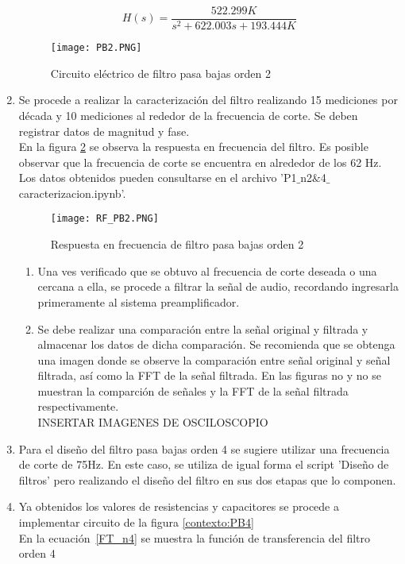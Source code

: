 \documentclass[10pt,letterpaper,spanish,twoside]{report}
\begin{document}
\begin{enumerate}
\begin{equation}
 	H(s)=\frac{522.299K}{s^2+622.003s+193.444K}\label{FT_n2}
 \end{equation}  
 \begin{figure}[H]
 	\centering
 	\texttt{[image: PB2.PNG]}
 	\caption{Circuito eléctrico de filtro pasa bajas orden 2}
	\label{contexto:PB2}
 \end{figure}
 \item Se procede a realizar la caracterización del filtro realizando 15 mediciones por década y 10 mediciones al rededor de la frecuencia de corte. Se deben registrar datos de magnitud y fase.
 \\ En la figura \ref{contexto:RF_2} se observa la respuesta en frecuencia del filtro. Es posible observar que la frecuencia de corte se encuentra en alrededor de los 62 Hz.
 \\Los datos obtenidos pueden consultarse en el archivo 'P1$\_$n2$\&$4$\_$caracterizacion.ipynb'.
 \begin{figure}[H]
 	\centering
 	\texttt{[image: RF\_PB2.PNG]}
 	\caption{Respuesta en frecuencia de filtro pasa bajas orden 2}
	\label{contexto:RF_2}
 \end{figure}
 \begin{enumerate}
  \item Una ves verificado que se obtuvo al frecuencia de corte deseada o una cercana a ella, se procede a filtrar la señal de audio, recordando ingresarla primeramente al sistema preamplificador.
  \item Se debe realizar una comparación entre la señal original y filtrada y almacenar los datos de dicha comparación. Se recomienda que se obtenga una imagen donde se observe la comparación entre señal original y señal filtrada, así como la FFT de la señal filtrada. En las figuras no y no se muestran la comparción de señales y la FFT de la señal filtrada respectivamente.
  \\ INSERTAR IMAGENES DE OSCILOSCOPIO
 \end{enumerate}
 \item Para el diseño del filtro pasa bajas orden 4 se sugiere utilizar una frecuencia de corte de 75Hz. En este caso, se utiliza de igual forma el script 'Diseño de filtros' pero realizando el diseño del filtro en sus dos etapas que lo componen.
 \item Ya obtenidos los valores de resistencias y capacitores se procede a implementar circuito de la figura \ref{contexto:PB4}
 \\En la ecuación~\eqref{FT_n4} se muestra la función de transferencia del filtro orden 4

\end{enumerate}
\end{document}
